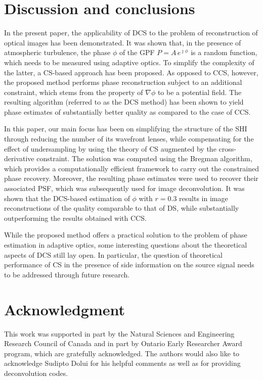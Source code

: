 \pdfoutput=1 \documentclass[journal]{IEEEtran}
\begin{document}
\section{Discussion and conclusions}
In the present paper, the applicability of DCS to the problem of reconstruction of optical images has been demonstrated. It was shown that, in the presence of atmospheric turbulence, the phase $\phi$ of the GPF $P = A \, e^{\jmath \phi}$ is a random function, which needs to be measured using adaptive optics. To simplify the complexity of the latter, a CS-based approach has been proposed. As opposed to CCS, however, the proposed method performs phase reconstruction subject to an additional constraint, which stems from the property of $\nabla \phi$ to be a potential field. The resulting algorithm (referred to as the DCS method) has been shown to yield phase estimates of substantially better quality as compared to the case of CCS.

In this paper, our main focus has been on simplifying the structure of the SHI through reducing the number of its wavefront lenses, while compensating for the effect of undersampling by using the theory of CS augmented by the cross-derivative constraint. The solution was computed using the Bregman algorithm, which provides a computationally efficient framework to carry out the constrained phase recovery. Moreover, the resulting phase estimates were used to recover their associated PSF, which was subsequently used for image deconvolution. It was shown that the DCS-based estimation of $\phi$ with $r=0.3$ results in image reconstructions of the quality comparable to that of DS, while substantially outperforming the results obtained with CCS.

While the proposed method offers a practical solution to the problem of phase estimation in adaptive optics, some interesting questions about the theoretical aspects of DCS still lay open. In particular, the question of theoretical performance of CS in the presence of side information on the source signal needs to be addressed through future research.

\section*{Acknowledgment}
This work was supported in part by the Natural Sciences and Engineering Research Council of Canada and in part by Ontario Early Researcher Award program, which are gratefully acknowledged. The authors would also like to acknowledge Sudipto Dolui for his helpful comments as well as for providing deconvolution codes.



\end{document}
